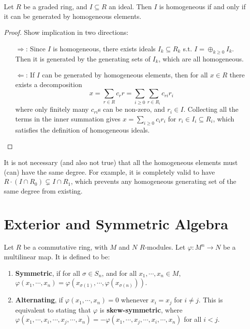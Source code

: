 \begin{proposition}
    Let $R$ be a graded ring, and $I \subseteq R$ an ideal. Then $I$ is homogeneous if and only if it can be generated by homogeneous elements. 
\end{proposition}

\begin{proof}
    Show implication in two directions:
    \begin{enumerate}
        \item[$\Rightarrow$:] Since $I$ is homogeneous, there exists ideals $I_k \subseteq R_k$ s.t. $I = \oplus_{k \geq 0} I_k$. Then it is generated by the generating sets of $I_k$, which are all homogeneous.
        \item[$\Leftarrow$:] If $I$ can be generated by homogeneous elements, then for all $x \in R$ there exists a decomposition
        \[
            x = \sum_{r \in R} c_r r = \sum_{i \geq 0} \sum_{r \in R_i} c_{ri} r_i
        \]
        where only finitely many $c_{ri}$s can be non-zero, and $r_i \in I$. Collecting all the terms in the inner summation gives $x = \sum_{i \geq 0} c_i r_i$ for $r_i \in I_i \subseteq R_i$, which satisfies the definition of homogeneous ideals.
    \end{enumerate}
\end{proof}

\begin{remark}
    It is not necessary (and also not true) that all the homogeneous elements must (can) have the same degree. For example, it is completely valid to have $R \cdot (I \cap R_0) \subsetneq I \cap R_1$, which prevents any homogeneous generating set of the same degree from existing. 
\end{remark}

\section{Exterior and Symmetric Algebra}

\begin{definition}
    Let $R$ be a commutative ring, with $M$ and $N$ $R$-modules. Let $\varphi: M^n \to N$ be a multilinear map. It is defined to be:
    \begin{enumerate}[label=\roman*)]
        \item \textbf{Symmetric}, if for all $\sigma \in S_n$, and for all $x_1, \cdots, x_n \in M$, $\varphi(x_1, \cdots, x_n) = \varphi(x_{\sigma(1)}, \cdots, \varphi(x_{\sigma(n)}))$.
        \item \textbf{Alternating}, if $\varphi(x_1, \cdots, x_n) = 0$ whenever $x_i = x_j$ for $i \neq j$. This is equivalent to stating that $\varphi$ is \textbf{skew-symmetric}, where $\varphi(x_1, \cdots, x_i, \cdots, x_j, \cdots, x_n) = -\varphi(x_1, \cdots, x_j, \cdots, x_i, \cdots, x_n)$ for all $i < j$.
    \end{enumerate}
\end{definition}


